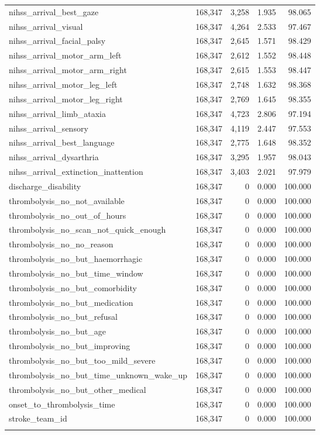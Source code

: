 \begin{longtable}{lrrrr}
nihss\_arrival\_best\_gaze & 168,347 & 3,258 & 1.935 & 98.065 \\
nihss\_arrival\_visual & 168,347 & 4,264 & 2.533 & 97.467 \\
nihss\_arrival\_facial\_palsy & 168,347 & 2,645 & 1.571 & 98.429 \\
nihss\_arrival\_motor\_arm\_left & 168,347 & 2,612 & 1.552 & 98.448 \\
nihss\_arrival\_motor\_arm\_right & 168,347 & 2,615 & 1.553 & 98.447 \\
nihss\_arrival\_motor\_leg\_left & 168,347 & 2,748 & 1.632 & 98.368 \\
nihss\_arrival\_motor\_leg\_right & 168,347 & 2,769 & 1.645 & 98.355 \\
nihss\_arrival\_limb\_ataxia & 168,347 & 4,723 & 2.806 & 97.194 \\
nihss\_arrival\_sensory & 168,347 & 4,119 & 2.447 & 97.553 \\
nihss\_arrival\_best\_language & 168,347 & 2,775 & 1.648 & 98.352 \\
nihss\_arrival\_dysarthria & 168,347 & 3,295 & 1.957 & 98.043 \\
nihss\_arrival\_extinction\_inattention & 168,347 & 3,403 & 2.021 & 97.979 \\
discharge\_disability & 168,347 & 0 & 0.000 & 100.000 \\
thrombolysis\_no\_not\_available & 168,347 & 0 & 0.000 & 100.000 \\
thrombolysis\_no\_out\_of\_hours & 168,347 & 0 & 0.000 & 100.000 \\
thrombolysis\_no\_scan\_not\_quick\_enough & 168,347 & 0 & 0.000 & 100.000 \\
thrombolysis\_no\_no\_reason & 168,347 & 0 & 0.000 & 100.000 \\
thrombolysis\_no\_but\_haemorrhagic & 168,347 & 0 & 0.000 & 100.000 \\
thrombolysis\_no\_but\_time\_window & 168,347 & 0 & 0.000 & 100.000 \\
thrombolysis\_no\_but\_comorbidity & 168,347 & 0 & 0.000 & 100.000 \\
thrombolysis\_no\_but\_medication & 168,347 & 0 & 0.000 & 100.000 \\
thrombolysis\_no\_but\_refusal & 168,347 & 0 & 0.000 & 100.000 \\
thrombolysis\_no\_but\_age & 168,347 & 0 & 0.000 & 100.000 \\
thrombolysis\_no\_but\_improving & 168,347 & 0 & 0.000 & 100.000 \\
thrombolysis\_no\_but\_too\_mild\_severe & 168,347 & 0 & 0.000 & 100.000 \\
thrombolysis\_no\_but\_time\_unknown\_wake\_up & 168,347 & 0 & 0.000 & 100.000 \\
thrombolysis\_no\_but\_other\_medical & 168,347 & 0 & 0.000 & 100.000 \\
onset\_to\_thrombolysis\_time & 168,347 & 0 & 0.000 & 100.000 \\
stroke\_team\_id & 168,347 & 0 & 0.000 & 100.000 \\
\label{tab:missing_ml}
\end{longtable}

